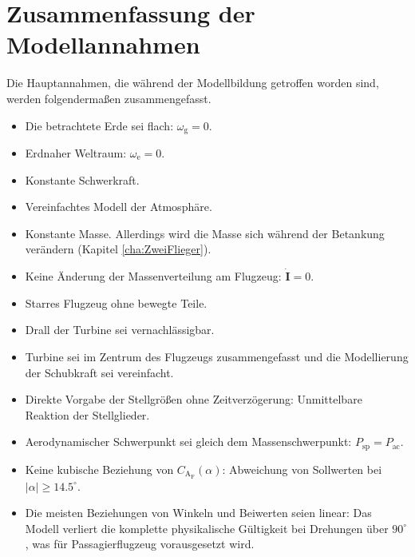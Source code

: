\section{Zusammenfassung der Modellannahmen}
Die Hauptannahmen, die während der Modellbildung getroffen worden sind, werden folgenderma{\ss}en zusammengefasst.
\begin{itemize}
\item Die betrachtete Erde sei flach: $\omega_\mathrm{g} = 0$.
\item Erdnaher Weltraum: $\omega_\mathrm{e} = 0$.
\item Konstante Schwerkraft.
\item Vereinfachtes Modell der Atmosphäre. 
\item Konstante Masse. Allerdings wird die Masse sich während der Betankung verändern (Kapitel \ref{cha:ZweiFlieger}).
\item Keine Änderung der Massenverteilung am Flugzeug: $\dot{\textbf{I}} = 0$.
\item Starres Flugzeug ohne bewegte Teile.
\item Drall der Turbine sei vernachlässigbar.
\item Turbine sei im Zentrum des Flugzeugs zusammengefasst und die Modellierung der Schubkraft sei vereinfacht.
\item Direkte Vorgabe der Stellgrö{\ss}en ohne Zeitverzögerung: Unmittelbare Reaktion der Stellglieder.
\item Aerodynamischer Schwerpunkt sei gleich dem Massenschwerpunkt: $P_\mathrm{sp} = P_\mathrm{ac}$.
\item Keine kubische Beziehung von $C_\mathrm{A_F}(\alpha)$: Abweichung von Sollwerten bei $|\alpha|\geq 14.5^{\circ}$.
\item Die meisten Beziehungen von Winkeln und Beiwerten seien linear: Das Modell verliert die komplette physikalische Gültigkeit bei Drehungen über $90^{\circ}$, was für Passagierflugzeug vorausgesetzt wird.

\end{itemize}

